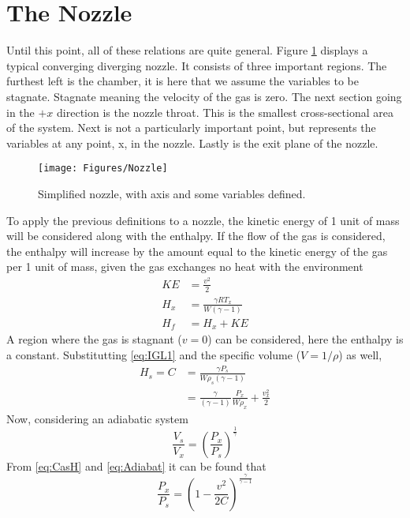 \section{The Nozzle}
Until this point, all of these relations are quite general. Figure \ref{fig:Nozzle} displays a typical converging diverging nozzle. It consists of three important regions. The furthest left is the chamber, it is here that we assume the variables to be stagnate. Stagnate meaning the velocity of the gas is zero. The next section going in the $+x$ direction is the nozzle throat. This is the smallest cross-sectional area of the system. Next is not a particularly important point, but represents the variables at any point, x, in the nozzle. Lastly is the exit plane of the nozzle. 
\begin{figure}[h!]
\centering
\texttt{[image: Figures/Nozzle]}
\caption{Simplified nozzle, with axis and some variables defined.}
\label{fig:Nozzle}
\end{figure}
To apply the previous definitions to a nozzle, the kinetic energy of 1 unit of mass will be considered along with the enthalpy. If the flow of the gas is considered, the enthalpy will increase by the amount equal to the kinetic energy of the gas per 1 unit of mass, given the gas exchanges no heat with the environment
\begin{align}
KE&=\frac{v^2}{2}\\
H_x&=\frac{\gamma RT_x}{W(\gamma-1)}\\
H_f&=H_x + KE
\end{align}%
A region where the gas is stagnant ($v=0$) can be considered, here the enthalpy is a constant. Substitutting \ref{eq:IGL1} and the specific volume ($V=1/\rho$) as well,
\begin{align}\label{eq:CasH}
H_s=C&=\frac{\gamma P_s}{W\rho_s(\gamma-1)}\\
&=\frac{\gamma}{(\gamma-1)}\frac{P_x}{W\rho_x}+\frac{v_x^2}{2}
\end{align}%
Now, considering an adiabatic system
\begin{equation}\label{eq:Adiabat}
\frac{V_s}{V_x}=\left(\frac{P_x}{P_s}\right)^{\frac{1}{\gamma}}
\end{equation}
From \ref{eq:CasH} and \ref{eq:Adiabat} it can be found that
\begin{equation}\label{eq:1.20}
\frac{P_x}{P_s}=\left(1-\frac{v^2}{2C}\right)^{\frac{\gamma}{\gamma-1}}
\end{equation}
